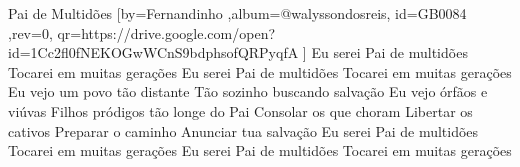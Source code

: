 \beginsong
{Pai de Multidões %
}[by={Fernandinho %
},album={@walyssondosreis},
id={GB0084 %
},rev={0}, %
qr={https://drive.google.com/open?id=1Cc2fl0fNEKOGwWCnS9bdphsofQRPyqfA %
}]
\beginverse*
Eu serei Pai de multidões
Tocarei em muitas gerações
Eu serei Pai de multidões
Tocarei em muitas gerações
\endverse
\beginverse*
Eu vejo um povo tão distante
Tão sozinho buscando salvação
Eu vejo órfãos e viúvas
Filhos pródigos tão longe do Pai
\endverse
\beginverse*
Consolar os que choram
Libertar os cativos
Preparar o caminho
Anunciar tua salvação
\endverse
\beginchorus
Eu serei Pai de multidões
Tocarei em muitas gerações
Eu serei Pai de multidões
Tocarei em muitas gerações
\endchorus

